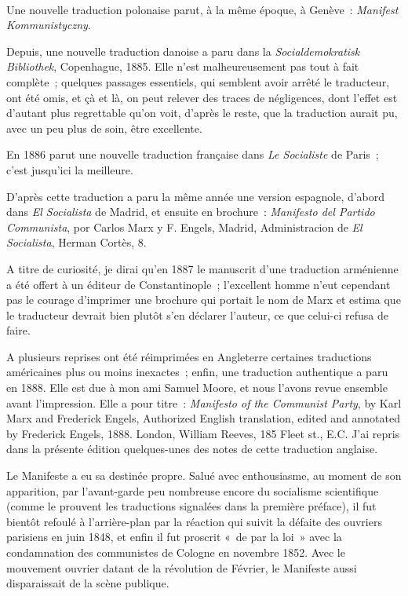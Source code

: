 \documentclass[french,twoside]{book} %
\begin{document}
 \par
Une nouvelle traduction polonaise parut, à la même époque, à Genève : \emph{Manifest Kommunistyczny}.\par
Depuis, une nouvelle traduction danoise a paru dans la \emph{Socialdemokratisk Bibliothek}, Copenhague, 1885. Elle n’est malheureusement pas tout à fait complète ; quelques passages essentiels, qui semblent avoir arrêté le traducteur, ont été omis, et çà et là, on peut relever des traces de négligences, dont l’effet est d’autant plus regrettable qu’on voit, d’après le reste, que la traduction aurait pu, avec un peu plus de soin, être excellente.\par
En 1886 parut une nouvelle traduction française dans \emph{Le Socialiste} de Paris ; c’est jusqu’ici la meilleure.\par
D'après cette traduction a paru la même année une version espagnole, d’abord dans \emph{El Socialista} de Madrid, et ensuite en brochure : \emph{Manifesto del Partido Communista}, por Carlos Marx y F. Engels, Madrid, Administracion de \emph{El Socialista}, Herman Cortès, 8.\par
A titre de curiosité, je dirai qu’en 1887 le manuscrit d’une traduction arménienne a été offert à un éditeur de Constantinople ; l’excellent homme n’eut cependant pas le courage d’imprimer une brochure qui portait le nom de Marx et estima que le traducteur devrait bien plutôt s’en déclarer l’auteur, ce que celui-ci refusa de faire.\par
A plusieurs reprises ont été réimprimées en Angleterre certaines traductions américaines plus ou moins inexactes ; enfin, une traduction authentique a paru en 1888. Elle est due à mon ami Samuel Moore, et nous l’avons revue ensemble avant l’impression. Elle a pour titre : \emph{Manifesto of the Communist Party}, by Karl Marx and Frederick Engels, Authorized English translation, edited and annotated by Frederick Engels, 1888. London, William Reeves, 185 Fleet st., E.C. J'ai repris dans la présente édition quelques-unes des notes de cette traduction anglaise.\par
Le Manifeste a eu sa destinée propre. Salué avec enthousiasme, au moment de son apparition, par l’avant-garde peu nombreuse encore du socialisme scientifique (comme le prouvent les traductions signalées dans la première préface), il fut bientôt refoulé à l’arrière-plan par la réaction qui suivit la défaite des ouvriers parisiens en juin 1848, et enfin il fut proscrit « de par la loi » avec la condamnation des communistes de Cologne en novembre 1852. Avec le mouvement ouvrier datant de la révolution de Février, le Manifeste aussi disparaissait de la scène publique.\par
\end{document}
